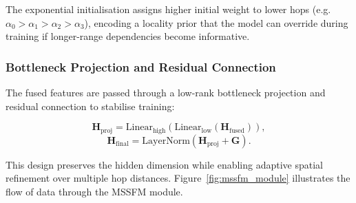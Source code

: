 \documentclass[final,1p,times]{elsarticle}
\begin{document}
The exponential initialisation assigns higher initial weight to lower hops (e.g.\ $\alpha_0 > \alpha_1 > \alpha_2 > \alpha_3$), encoding a locality prior that the model can override during training if longer-range dependencies become informative.

\subsubsection{Bottleneck Projection and Residual Connection}

The fused features are passed through a low-rank bottleneck projection and residual connection to stabilise training:

\begin{equation}
\mathbf{H}_{\text{proj}} = \text{Linear}_{\text{high}}(\text{Linear}_{\text{low}}(\mathbf{H}_{\text{fused}})),
\end{equation}
\begin{equation}
\mathbf{H}_{\text{final}} = \text{LayerNorm}(\mathbf{H}_{\text{proj}} + \mathbf{G}).
\end{equation}

This design preserves the hidden dimension while enabling adaptive spatial refinement over multiple hop distances. Figure~\ref{fig:mssfm_module} illustrates the flow of data through the MSSFM module.
\end{document}
